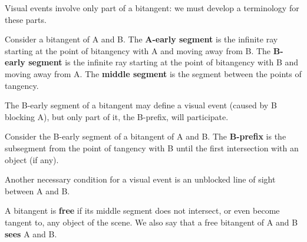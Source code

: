 \documentclass[12pt]{article}
\newif\ifCommentary             %
\begin{document}
Visual events involve only part of a bitangent: 
we must develop a terminology for these parts.

\begin{defn2}
\label{defn:seg}
Consider a bitangent of A and B.
The {\bf A-early segment} is the infinite ray starting
at the point of bitangency with A and moving away from B.
The {\bf B-early segment} is the infinite ray starting
at the point of bitangency with B and moving away from A.
The {\bf middle segment} is the segment between the points of tangency.
\end{defn2}

The B-early segment of a bitangent may define a visual event (caused by B blocking A),
but only part of it, the B-prefix, will participate. 

\begin{defn2}
\label{defn:prefix}
Consider the B-early segment of a bitangent of A and B.
The {\bf B-prefix} is the subsegment
from the point of tangency with B until the first intersection with an object (if any).
\end{defn2}

Another necessary condition for a visual event is an unblocked
line of sight between A and B.

\begin{defn2}
A bitangent is {\bf free} if its middle segment does not intersect, 
or even become tangent to, any object of the scene.
We also say that a free bitangent of A and B {\bf sees} A and B.
\end{defn2}
\end{document}
